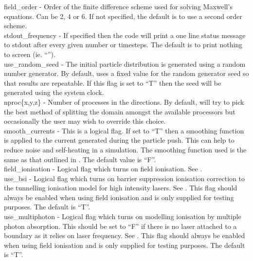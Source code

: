 {\emphtext field\_order} - Order of the finite difference scheme used for
solving Maxwell's equations. Can be 2, 4 or 6. If not specified, the default
is to use a second order scheme.\\

{\emphtext stdout\_frequency} - If specified then the code will print a one
line status message to stdout after every given number or timesteps. The
default is to print nothing to screen (ie. ``'').\\

{\emphtext use\_random\_seed} - The initial particle distribution is
generated using a random number generator. By default, {\EPOCH} uses a fixed
value for the random generator seed so that results are repeatable. If this
flag is set to ``T'' then the seed will be generated using the system clock.\\

{\emphtext nproc\{x,y,z\}} - Number of processes in the 
directions. By default, {\EPOCH} will try to pick the best method of splitting
the domain amongst the available processors but occasionally the user may
wish to override this choice.\\

{\emphtext smooth\_currents} - This is a logical flag. If set to ``T'' then
a smoothing function is applied to the current generated during the particle
push. This can help to reduce noise and self-heating in a simulation. The
smoothing function used is the same as that outlined in \citet{Buneman}.
The default value is ``F''.\\

{\emphtext field\_ionisation} - Logical flag which turns on field ionisation.
  See .\\

{\emphtext use\_bsi} - Logical flag which turns on barrier suppression
  ionisation correction to the tunnelling ionisation model for high intensity
  lasers. See . This flag should always be enabled when
  using field ionisation and is only supplied for testing purposes.
  The default is ``T''.\\

{\emphtext use\_multiphoton} - Logical flag which turns on modelling
  ionisation by multiple photon absorption. This should be set to ``F'' if
  there is no laser attached to a boundary as it relies on laser frequency.
  See . This flag should always be enabled when
  using field ionisation and is only supplied for testing purposes.
  The default is ``T''.\\

